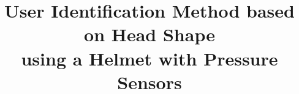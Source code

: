 \documentclass[sigchi,authordraft]{acmart}
\begin{document}
\title{User Identification Method based on Head Shape\\using a Helmet with Pressure Sensors}



\renewcommand{\shortauthors}{Fujii and Murao}
\end{document}
